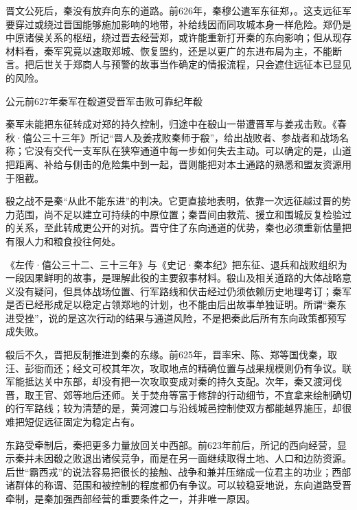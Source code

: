 晋文公死后，秦没有放弃向东的道路。前626年，秦穆公遣军东征郑，。这支远征军要穿过或绕过晋国能够施加影响的地带，补给线因而同攻城本身一样危险。郑仍是中原诸侯关系的枢纽，绕过晋去经营郑，或许能重新打开秦的东向影响；但从现存材料看，秦军究竟以速取郑城、恢复盟约，还是以更广的东进布局为主，不能断言。把后世关于郑商人与预警的故事当作确定的情报流程，只会遮住远征本已显见的风险。

\begin{event}{公元前627年}{秦军在殽道受晋军击败}{可靠纪年}{殽}

秦军未能把东征转成对郑的持久控制，归途中在殽山一带遭晋军与姜戎击败。《春秋·僖公三十三年》所记“晋人及姜戎败秦师于殽”，给出战败者、参战者和战场名称；它没有交代一支军队在狭窄通道中每一步如何失去主动。可以确定的是，山道把距离、补给与侧击的危险集中到一起，晋则能把对本土通路的熟悉和盟友资源用于阻截。

殽之战不是秦“从此不能东进”的判决。它更直接地表明，依靠一次远征越过晋的势力范围，尚不足以建立可持续的中原位置；秦晋间由救荒、援立和围城反复检验过的关系，至此转成更公开的对抗。晋守住了东向通道的优势，秦也必须重新估量把有限人力和粮食投往何处。
\end{event}

\begin{debate}[殽道的确定与东征的限度]
《左传·僖公三十二、三十三年》与《史记·秦本纪》把东征、退兵和战败组织为一段因果鲜明的故事，是理解此役的主要叙事材料。殽山及相关道路的大体战略意义没有疑问，但具体战场位置、行军路线和伏击经过仍须依赖历史地理考订；秦军是否已经形成足以稳定占领郑地的计划，也不能由后出故事单独证明。所谓“秦东进受挫”，说的是这次行动的结果与通道风险，不是把秦此后所有东向政策都预写成失败。
\end{debate}

殽后不久，晋把反制推进到秦的东缘。前625年，晋率宋、陈、郑等国伐秦，取汪、彭衙而还；经文可校其年次，攻取地点的精确位置与战果规模则仍有争议。联军能抵达关中东部，却没有把一次攻取变成对秦的持久支配。次年，秦又渡河伐晋，取王官、郊等地后还师。关于焚舟等富于修辞的行动细节，不宜拿来绘制确切的行军路线；较为清楚的是，黄河渡口与沿线城邑控制使双方都能越界施压，却很难把短促远征固定为稳定占有。

东路受牵制后，秦把更多力量放回关中西部。前623年前后，所记的西向经营，显示秦并未因殽之败退出诸侯竞争，而是在另一面继续取得土地、人口和边防资源。后世“霸西戎”的说法容易把很长的接触、战争和兼并压缩成一位君主的功业；西部诸群体的称谓、范围和被控制的程度都仍有争议。可以较稳妥地说，东向道路受晋牵制，是秦加强西部经营的重要条件之一，并非唯一原因。

